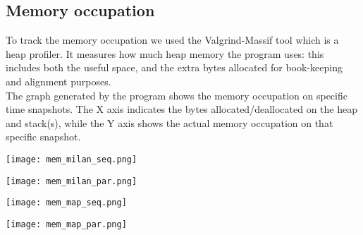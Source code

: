 \subsection{Memory occupation}

To track the memory occupation we used the Valgrind-Massif \cite{bibValgrind} tool which is a heap profiler. It measures how much heap memory the program uses: this includes both the useful space,
and the extra bytes allocated for book-keeping and alignment purposes.
\\
The graph generated by the program shows the memory occupation on specific time snapshots. The X axis indicates the bytes allocated/deallocated on the heap and stack(s), while the Y axis shows the actual memory occupation on that specific snapshot.

\vspace{0.5cm}

\begin{center}
    \begin{minipage}[b]{0.45\textwidth}
        \texttt{[image: mem\_milan\_seq.png]}
        \label{mem-seq-milan}
    \end{minipage}
    \hspace{0.5cm}
    \begin{minipage}[b]{0.45\textwidth}
        \texttt{[image: mem\_milan\_par.png]}
        \label{mem-par-milan}
    \end{minipage}%
    
    \vspace{0.5cm}
    
    \begin{minipage}[b]{0.45\textwidth}
        \texttt{[image: mem\_map\_seq.png]}
        \label{mem-seq-map}
    \end{minipage}%
    \hspace{0.5cm}
    \begin{minipage}[b]{0.45\textwidth}
        \texttt{[image: mem\_map\_par.png]}
        \label{mem-par-map}
    \end{minipage}

\end{center}

\vspace{0.5cm}

